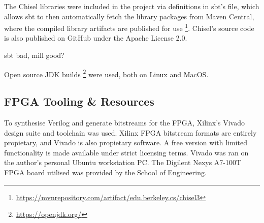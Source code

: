 The Chisel libraries were included in the project via definitions in sbt's  file, which allows sbt to then automatically fetch the library packages from Maven Central, where the compiled library artifacts are published for use \footnote{\url{https://mvnrepository.com/artifact/edu.berkeley.cs/chisel3}}. Chisel's source code is also published on GitHub under the Apache License 2.0.

sbt bad, mill good?

Open source JDK builds \footnote{\url{https://openjdk.org/}} were used, both on Linux and MacOS.

\subsection{FPGA Tooling \& Resources}

To synthesise Verilog and generate bitstreams for the FPGA, Xilinx's Vivado design suite and toolchain was used. Xilinx FPGA bitstream formats are entirely propietary, and Vivado is also propietary software. A free version with limited functionality is made available under strict licensing terms. Vivado was ran on the author's personal Ubuntu workstation PC. The Digilent Nexys A7-100T FPGA board utilised was provided by the School of Engineering.

